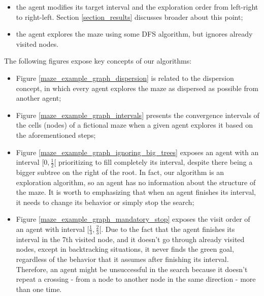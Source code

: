 \begin{itemize}
	\begin{itemize}

	\item the agent modifies its target interval and the exploration order from left-right to right-left. Section \ref{section_results} discusses broader about this point;
	
	\item the agent explores the maze using some DFS algorithm, but ignores already visited nodes.
	
	\end{itemize}
\end{itemize}

The following figures expose key concepts of our algorithms:

\begin{itemize}

\item Figure \ref{maze_example_graph_dispersion} is related to the dispersion concept, in which every agent explores the maze as dispersed as possible from another agent;
	
\item Figure \ref{maze_example_graph_intervals} presents the convergence intervals of the cells (nodes) of a fictional maze when a given agent explores it based on the aforementioned steps;

\item Figure \ref{maze_example_graph_ignoring_big_trees} exposes an agent with an interval $[0,\frac{1}{2}[$ prioritizing to fill completely its interval, despite there being a bigger subtree on the right of the root. In fact, our algorithm is an exploration algorithm, so an agent has no information about the structure of the maze. It is worth to emphasizing that when an agent finishes its interval, it needs to change its behavior or simply stop the search;

\item Figure \ref{maze_example_graph_mandatory_stop} exposes the visit order of an agent with interval $[\frac{1}{3},\frac{2}{3}[$. Due to the fact that the agent finishes its interval in the 7th visited node, and it doesn't go through already visited nodes, except in backtracking situations, it never finds the green goal, regardless of the behavior that it assumes after finishing its interval. Therefore, an agent might be unsuccessful in the search because it doesn't repeat a crossing - from a node to another node in the same direction - more than one time.
	
\end{itemize}


